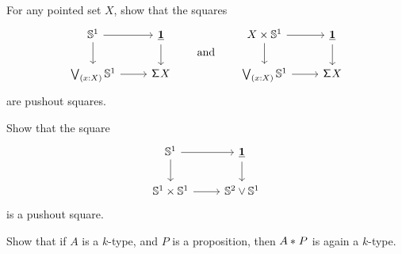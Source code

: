 \begin{exercises}
\item For any pointed set $X$, show that the squares
  \begin{equation*}
    \begin{tikzcd}
      \sphere{1} \arrow[r] \arrow[d] & \unit \arrow[d] \\
      \bigvee_{(x:X)}\sphere{1} \arrow[r] & \susp{X}
    \end{tikzcd}
    \qquad\text{and}\qquad
    \begin{tikzcd}
      X\times \sphere{1} \arrow[d] \arrow[r] & \unit \arrow[d] \\
      \bigvee_{(x:X)}\sphere{1} \arrow[r] & \susp{X}
    \end{tikzcd}
  \end{equation*}
  are pushout squares.
\item Show that the square
  \begin{equation*}
    \begin{tikzcd}
      \sphere{1} \arrow[r] \arrow[d] & \unit \arrow[d] \\
      \sphere{1}\times\sphere{1} \arrow[r] & \sphere{2}\vee\sphere{1}
    \end{tikzcd}
  \end{equation*}
  is a pushout square.
\item \label{ex:trunc-join-with-prop}Show that if $A$ is a $k$-type, and $P$ is a proposition, then ${A}\ast_{}{P}$ is again a $k$-type.
\end{exercises}
